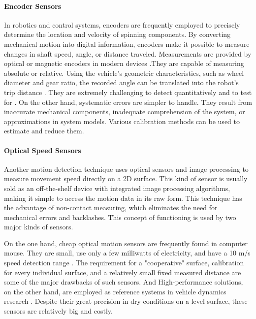 \paragraph{Encoder Sensors}
In robotics and control systems, encoders are frequently employed to precisely determine the location and velocity of spinning components. By converting mechanical motion into digital information, encoders make it possible to measure changes in shaft speed, angle, or distance traveled. Measurements are provided by optical or magnetic encoders in modern devices  \citep{Smith2019} .They are capable of measuring absolute or relative. Using the vehicle's geometric characteristics, such as wheel diameter and gear ratio, the recorded angle can be translated into the robot's trip distance \citep{Doe2020}.
They are extremely challenging to detect quantitatively and to test for \citep{Borenstein1994UMBmarkA}. On the other hand, systematic errors are simpler to handle. They result from inaccurate mechanical components, inadequate comprehension of the system, or approximations in system models. Various calibration methods can be used to estimate and reduce them.

\paragraph{Optical Speed Sensors}
Another motion detection technique uses optical sensors and image processing to measure movement speed directly on a 2D surface. This kind of sensor is usually sold as an off-the-shelf device with integrated image processing algorithms, making it simple to access the motion data in its raw form. This technique has the advantage of non-contact measuring, which eliminates the need for mechanical errors and backlashes. This concept of functioning is used by two major kinds of sensors.

On the one hand, cheap optical motion sensors are frequently found in computer mouse. They are small, use only a few milliwatts of electricity, and have a 10 m/s speed detection range \citep{Logitech2020}. The requirement for a "cooperative" surface, calibration for every individual surface, and a relatively small fixed measured distance are some of the major drawbacks of such sensors.
And High-performance solutions, on the other hand, are employed as reference systems in vehicle dynamics research \citep{SensoricSolutions}. Despite their great precision in dry conditions on a level surface, these sensors are relatively big and costly.


